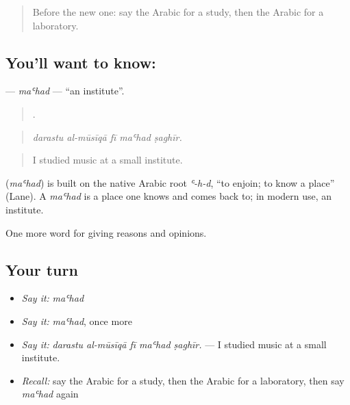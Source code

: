 \label{lesson:AR-C391-mahad}



\begin{quote}
Before the new one: say the Arabic for a study, then the Arabic for a laboratory.
\end{quote}

\subsection*{You'll want to know: }
\textbf{} — \emph{maʿhad} — \textquotedblleft{}an institute\textquotedblright{}.

\begin{quote}
    .
\end{quote}

\begin{quote}
\emph{darastu al-mūsīqā fī maʿhad ṣaghīr.}
\end{quote}

\begin{quote}
I studied music at a small institute.
\end{quote}

\begin{cousinweb}
\textbf{} (\emph{maʿhad}) is built on the native Arabic root \emph{ʿ-h-d}, \textquotedblleft{}to enjoin; to know a place\textquotedblright{} (Lane). A \emph{maʿhad} is a place one knows and comes back to; in modern use, an institute.
\end{cousinweb}

\begin{grammarlens}[title={What you've built}]
One more word for giving reasons and opinions.
\end{grammarlens}

\subsection*{Your turn}
\begin{itemize}
\raggedright
  \item \emph{Say it:} \emph{maʿhad}
  \item \emph{Say it:} \emph{maʿhad}, once more
  \item \emph{Say it:} \emph{darastu al-mūsīqā fī maʿhad ṣaghīr.} — I studied music at a small institute.
  \item \emph{Recall:} say the Arabic for a study, then the Arabic for a laboratory, then say \emph{maʿhad} again
\end{itemize}

